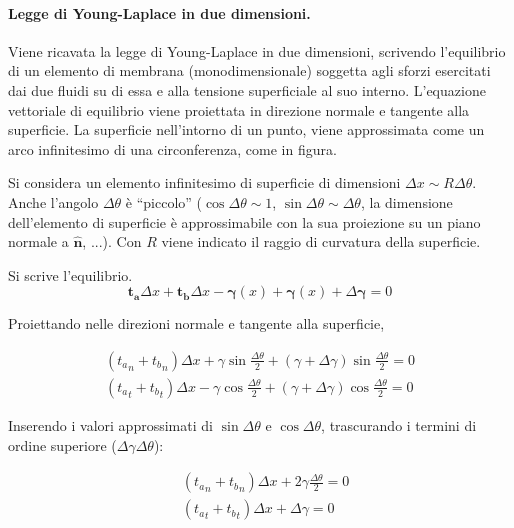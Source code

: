 \paragraph{Legge di Young-Laplace in due dimensioni.}
Viene ricavata la legge di Young-Laplace in due dimensioni, scrivendo l'equilibrio di un elemento di membrana (monodimensionale) soggetta agli sforzi esercitati dai due fluidi su di essa e alla tensione superficiale al suo interno. L'equazione vettoriale di equilibrio viene proiettata in direzione normale e tangente alla superficie. La superficie nell'intorno di un punto, viene approssimata come un arco infinitesimo di una circonferenza, come in figura.

Si considera un elemento infinitesimo di superficie di dimensioni $\Delta x \sim R \Delta \theta$. Anche l'angolo $\Delta \theta$ è ``piccolo'' ($\cos \Delta \theta \sim 1$, $\sin \Delta\theta \sim \Delta\theta$, la dimensione dell'elemento di superficie è approssimabile con la sua proiezione su un piano normale a $\bm{\hat{n}}$, ...). Con $R$ viene indicato il raggio di curvatura della superficie.

Si scrive l'equilibrio.
\begin{equation}
  \bm{t_a} \Delta x + \bm{t_b} \Delta x - \bm{\gamma}(x) + \bm{\gamma}(x) + \Delta \bm{\gamma} = 0
\end{equation}

Proiettando nelle direzioni normale e tangente alla superficie, 

\begin{equation}
 \begin{aligned}
  ( {t_a}_n + {t_b}_n )\Delta x + \gamma \sin \frac{\Delta\theta}{2}
      + (\gamma + \Delta \gamma) \sin \frac{\Delta\theta}{2} = 0 \\
  ( {t_a}_t + {t_b}_t )\Delta x - \gamma \cos \frac{\Delta\theta}{2}
      + (\gamma + \Delta \gamma) \cos\frac{\Delta \theta}{2} = 0
 \end{aligned}
\end{equation}

Inserendo i valori approssimati di $\sin \Delta \theta$ e $\cos \Delta \theta$, trascurando i termini di ordine superiore ($\Delta \gamma \Delta \theta$):

\begin{equation}
 \begin{aligned}
  & ( {t_a}_n + {t_b}_n )\Delta x + 2 \gamma \frac{\Delta \theta}{2} = 0 \\
  & ( {t_a}_t + {t_b}_t )\Delta x + \Delta \gamma = 0
 \end{aligned}
\end{equation}

